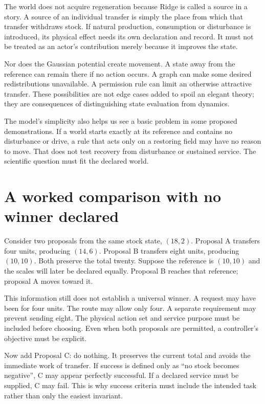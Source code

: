 The world does not acquire regeneration because Ridge is called a source in a story. A source of an individual transfer is simply the place from which that transfer withdraws stock. If natural production, consumption or disturbance is introduced, its physical effect needs its own declaration and record. It must not be treated as an actor's contribution merely because it improves the state.

Nor does the Gaussian potential create movement. A state away from the reference can remain there if no action occurs. A graph can make some desired redistributions unavailable. A permission rule can limit an otherwise attractive transfer. These possibilities are not edge cases added to spoil an elegant theory; they are consequences of distinguishing state evaluation from dynamics.

The model's simplicity also helps us see a basic problem in some proposed demonstrations. If a world starts exactly at its reference and contains no disturbance or drive, a rule that acts only on a restoring field may have no reason to move. That does not test recovery from disturbance or sustained service. The scientific question must fit the declared world.

\section{A worked comparison with no winner declared}
Consider two proposals from the same stock state, $(18,2)$. Proposal A transfers four units, producing $(14,6)$. Proposal B transfers eight units, producing $(10,10)$. Both preserve the total twenty. Suppose the reference is $(10,10)$ and the scales will later be declared equally. Proposal B reaches that reference; proposal A moves toward it.

This information still does not establish a universal winner. A request may have been for four units. The route may allow only four. A separate requirement may prevent sending eight. The physical action set and service purpose must be included before choosing. Even when both proposals are permitted, a controller's objective must be explicit.

Now add Proposal C: do nothing. It preserves the current total and avoids the immediate work of transfer. If success is defined only as ``no stock becomes negative'', C may appear perfectly successful. If a declared service must be supplied, C may fail. This is why success criteria must include the intended task rather than only the easiest invariant.

